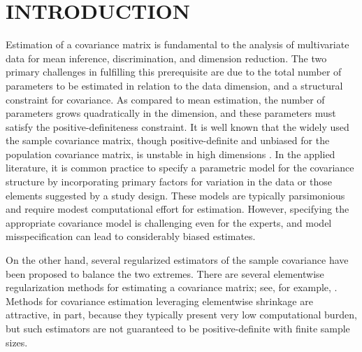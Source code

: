 \documentclass[12pt]{article}
\begin{document}
\section*{\sffamily \Large INTRODUCTION} 



Estimation of a  covariance matrix is fundamental to the analysis of multivariate data for mean inference, discrimination, and dimension reduction. The two primary challenges in fulfilling this prerequisite are due to the total number of parameters to be estimated in relation to the data dimension, and a structural constraint for covariance. As compared to mean estimation, the number of parameters grows quadratically in the dimension, and these parameters must satisfy the positive-definiteness constraint. It is well known that the widely used the sample covariance matrix, though positive-definite and unbiased for the population covariance matrix, is unstable in high dimensions \cite{lin1985monte,johnstone2001distribution}. In the applied literature, it is common practice to specify a parametric model for the covariance structure by incorporating primary factors for variation in the data or those elements suggested by a study design. These models are typically parsimonious and require modest computational effort for estimation. However, specifying the appropriate covariance model is challenging even for the experts, and model misspecification can lead to considerably biased estimates. 

On the other hand, several regularized estimators of the sample covariance have been proposed to balance the two extremes. There are several elementwise regularization methods for estimating a covariance matrix; see, for example, . Methods for covariance estimation leveraging elementwise shrinkage are attractive, in part, because they typically present very low computational burden, but such estimators are not guaranteed to be positive-definite with finite sample sizes.
\end{document}
